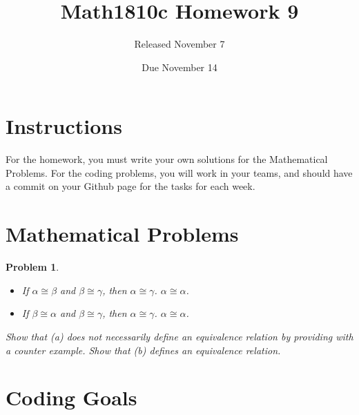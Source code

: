 \documentclass{article}
\title{Math1810c Homework 9}
\author{Released November 7}
\date{Due November 14}
\newtheorem{problem}{Problem}
\begin{document}
\maketitle

\section{Instructions}

For the homework, you must write your own solutions for the Mathematical Problems. For the coding problems, you will work in your teams, and should have a commit on your Github page for the tasks for each week. 

\section{Mathematical Problems}

\begin{problem}
\begin{itemize}
    \item[(a)] If $\alpha \cong \beta$ and $\beta \cong \gamma$, then $\alpha \cong \gamma$. $\alpha\cong \alpha$.
    \item[(b)] If $\beta \cong \alpha$ and $\beta \cong \gamma$, then $\alpha \cong \gamma$. $\alpha\cong \alpha$.
\end{itemize}
Show that (a) does not necessarily define an equivalence relation by providing with a counter example. Show that (b) defines an equivalence relation.
\end{problem}

\newpage

\section{Coding Goals}
\end{document}
